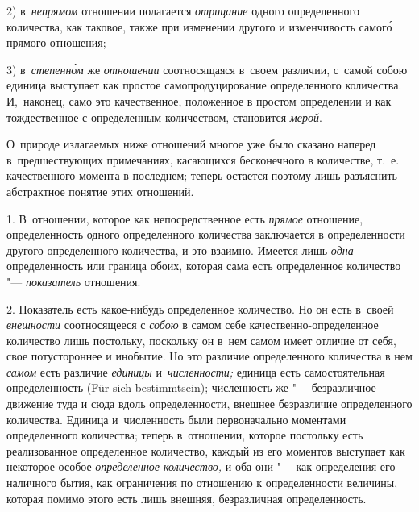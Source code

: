 2) в~{\em непрямом} отношении полагается {\em отрицание} одного определенного
количества, как таковое, также при изменении другого и изменчивость самог\'{о}
прямого отношения;

3) в~{\em степенн\'{о}м} же {\em отношении} соотносящаяся в~своем различии,
с~самой собою единица выступает как простое самопродуцирование определенного
количества. И,~наконец, само это качественное, положенное в простом определении
и как тождественное с определенным количеством, становится {\em мерой}.

О~природе излагаемых ниже отношений многое уже было сказано наперед
в~предшествующих примечаниях, касающихся бесконечного в количестве, т.~е.
качественного момента в последнем; теперь остается поэтому лишь разъяснить
абстрактное понятие этих отношений.


1. В~отношении, которое как непосредственное есть {\em прямое} отношение,
определенность одного определенного количества заключается в определенности
другого определенного количества, и это взаимно. Имеется лишь {\em одна}
определенность или граница обоих, которая сама есть определенное количество
"--- {\em показатель} отношения.

2. Показатель есть какое-нибудь определенное количество. Но он есть в~своей
{\em внешности} соотносящееся с {\em собою} в самом себе
качественно-определенное количество лишь постольку, поскольку он в~нем самом
имеет отличие от себя, свое потустороннее и инобытие. Но это различие
определенного количества в нем {\em самом} есть различие {\em единицы}
и~{\em численности;} единица есть самостоятельная определенность
(Für-sich-bestimmt\-sein); численность же "--- безразличное движение туда и
сюда вдоль определенности, внешнее безразличие определенного количества.
Единица и~численность были первоначально моментами определенного количества;
теперь в~отношении, которое постольку есть реализованное определенное
количество, каждый из его моментов выступает как некоторое особое
{\em определенное количество,} и оба они "--- как определения его наличного
бытия, как ограничения по отношению к определенности величины, которая помимо
этого есть лишь внешняя, безразличная определенность.


